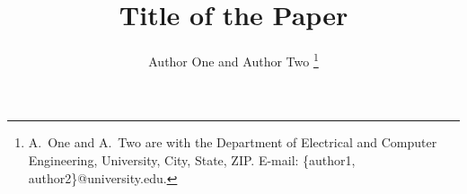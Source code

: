 

\title{Title of the Paper}
\author{Author One and Author Two %
\thanks{A.~One and A.~Two are with the Department of Electrical and Computer
Engineering, University, City, State, ZIP.
E-mail: \{author1, author2\}@university.edu.}}

\maketitle








\appendices




